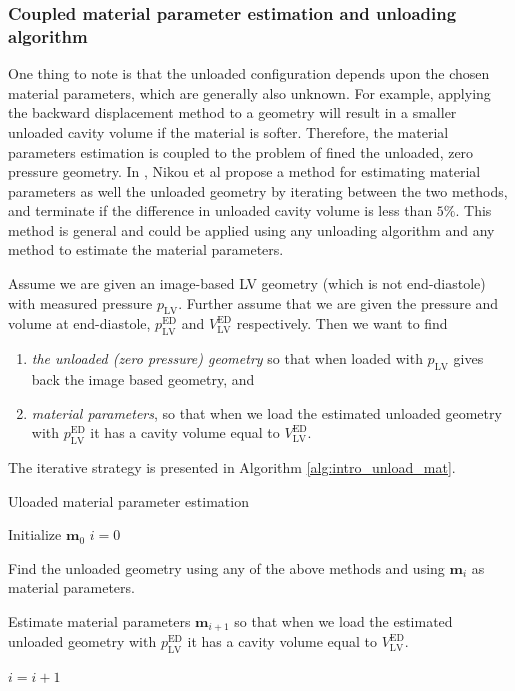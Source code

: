\subsubsection{Coupled material parameter estimation and unloading
  algorithm}
\label{sec:intro_coupled_material}
One thing to note is that the unloaded configuration depends upon the
chosen material parameters, which are generally also unknown. For
example, applying the backward displacement method to a geometry will
result in a smaller unloaded cavity volume if the material is softer.
Therefore, the material parameters estimation is coupled to the
problem of fined the unloaded, zero pressure geometry.
In \cite{nikou2016effects}, Nikou et al propose a method for estimating
material parameters as well the unloaded geometry by iterating between
the two methods, and terminate if the difference in unloaded cavity
volume is less than $5 \%$. This method is general and could be applied
using any unloading algorithm and any method to estimate the material
parameters.

Assume we are given an image-based LV geometry (which is not
end-diastole) with measured pressure $p_{\mathrm{LV}}$. Further assume
that we are given the pressure and  volume at end-diastole,
$p_{\mathrm{LV}}^{\mathrm{ED}}$ and $V_{\mathrm{LV}}^{\mathrm{ED}}$
respectively. Then we want to find
\begin{enumerate}
  \item \emph{the unloaded (zero pressure) geometry} so that when loaded with
    $p_{\mathrm{LV}}$ gives back the image based geometry, and
   \item \emph{material parameters}, so that when we load the
     estimated unloaded geometry with $p_{\mathrm{LV}}^{\mathrm{ED}}$
     it has a cavity volume equal to $V_{\mathrm{LV}}^{\mathrm{ED}}$.     
\end{enumerate}

The iterative strategy is presented in Algorithm \ref{alg:intro_unload_mat}.
\begin{algorithm}
  \caption{Uloaded material parameter estimation\label{alg:intro_unload_mat}}
  
\begin{algorithmic}[1]

  
  \State Initialize $\mathbf{m}_0$ 
  \State $i = 0$
    

  \State \parbox[t]{\dimexpr\linewidth-\algorithmicindent}{Find the
    unloaded geometry using any of the above methods and using
    $\mathbf{m}_{i}$ as material parameters.\strut} 
  \State \parbox[t]{\dimexpr\linewidth-\algorithmicindent}{Estimate
    material parameters $\mathbf{m}_{i+1}$ so that when we load the
    estimated unloaded geometry with $p_{\mathrm{LV}}^{\mathrm{ED}}$
    it has a cavity volume equal to $V_{\mathrm{LV}}^{\mathrm{ED}}$. \strut}    
  \State $i = i + 1$
  \EndWhile
  

\end{algorithmic}
\end{algorithm}

